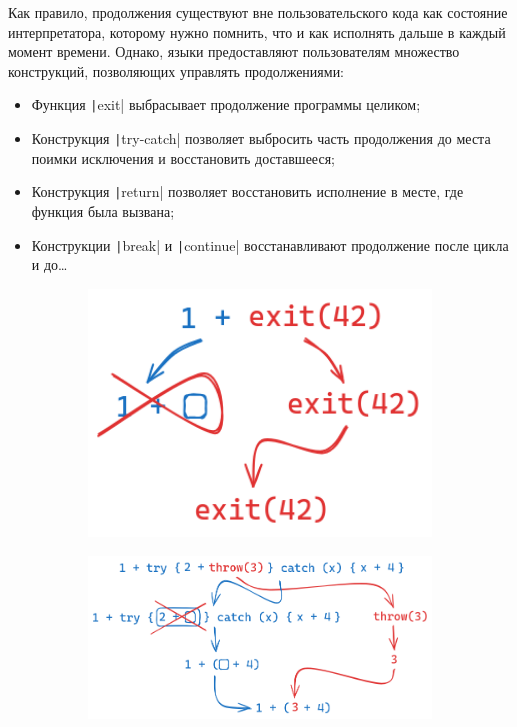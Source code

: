 Как правило, продолжения существуют вне пользовательского кода как состояние интерпретатора, которому нужно помнить, что и как исполнять дальше в каждый момент времени.
Однако, языки предоставляют пользователям множество конструкций, позволяющих управлять продолжениями:

\begin{itemize}
    \item Функция \texttt|exit| выбрасывает продолжение программы целиком;
    \item Конструкция \texttt|try-catch| позволяет выбросить часть продолжения до места поимки исключения и восстановить доставшееся;
    \item Конструкция \texttt|return| позволяет восстановить исполнение в месте, где функция была вызвана;
    \item Конструкции \texttt|break| и \texttt|continue| восстанавливают продолжение после цикла и до\ldots
\end{itemize}

\begin{figure}[h]
    \centering
    \begin{subfigure}[h]{0.29\linewidth}
        \includegraphics[width=1\textwidth]{figs/cont-exit}
    \end{subfigure}
    \begin{subfigure}[h]{0.7\linewidth}
        \includegraphics[width=1\textwidth]{figs/cont-try-catch}
    \end{subfigure}
\end{figure}

